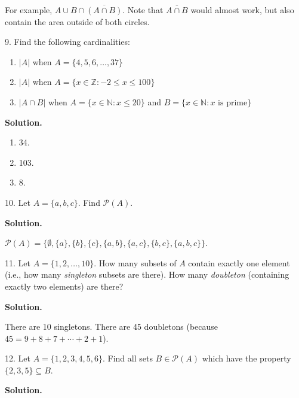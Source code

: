 \documentclass[10pt,]{book}
\theoremstyle{plain}
\theoremstyle{definition}
\theoremstyle{definition}
\theoremstyle{definition}
\numberwithin{equation}{section}
\def\N{\mathbb N}
\def\Z{\mathbb Z}
\def\pow{\mathcal P}
\def\st{:}
\def\bar{\overline}
\begin{document}
\begin{exerciselist}
            For example, \(A \cup B \cap \bar{(A \cap B)}\). Note that \(\bar{A \cap B}\) would almost work, but also contain the area outside of both circles.
\item[9.]\hypertarget{exercise-19}{}
            Find the following cardinalities:
\leavevmode%
\begin{enumerate}[label=(\alph*)]
\item\hypertarget{li-270}{}\(|A|\) when \(A = \{4,5,6,\ldots,37\}\)\item\hypertarget{li-271}{}\(|A|\) when \(A = \{x \in \Z \st -2 \le x \le 100\}\)\item\hypertarget{li-272}{}\(|A \cap B|\) when \(A = \{x \in \N \st x \le 20\}\) and \(B = \{x \in \N \st x \mbox{ is prime} \}\)\end{enumerate}
\par\smallskip
\par\smallskip
\noindent\textbf{Solution.}\hypertarget{solution-31}{}\quad
\leavevmode%
\begin{enumerate}[label=(\alph*)]
\item\hypertarget{li-273}{}
                34.
\item\hypertarget{li-274}{}
                103.
\item\hypertarget{li-275}{}
                8.
\end{enumerate}
\item[10.]\hypertarget{exercise-20}{}
            Let \(A = \{a, b, c\}\). Find \(\pow(A)\).
\par\smallskip
\par\smallskip
\noindent\textbf{Solution.}\hypertarget{solution-32}{}\quad

            \(\pow(A) = \{\emptyset, \{a\}, \{b\}, \{c\}, \{a,b\}, \{a,c\}, \{b,c\}, \{a,b,c\}\}\).
\item[11.]\hypertarget{exercise-21}{}
            Let \(A = \{1,2,\ldots, 10\}\). How many subsets of \(A\) contain exactly one element (i.e., how many \emph{singleton} subsets are there). How many \emph{doubleton} (containing exactly two elements) are there?
\par\smallskip
\par\smallskip
\noindent\textbf{Solution.}\hypertarget{solution-33}{}\quad

            There are 10 singletons. There are 45 doubletons (because \(45 = 9+8+7+\cdots+2+1\)).
\item[12.]\hypertarget{exercise-22}{}
            Let \(A = \{1,2,3,4,5,6\}\). Find all sets \(B \in \pow(A)\) which have the property \(\{2,3,5\} \subseteq B\).
\par\smallskip
\par\smallskip
\noindent\textbf{Solution.}\hypertarget{solution-34}{}\quad


\end{exerciselist}
\end{document}
